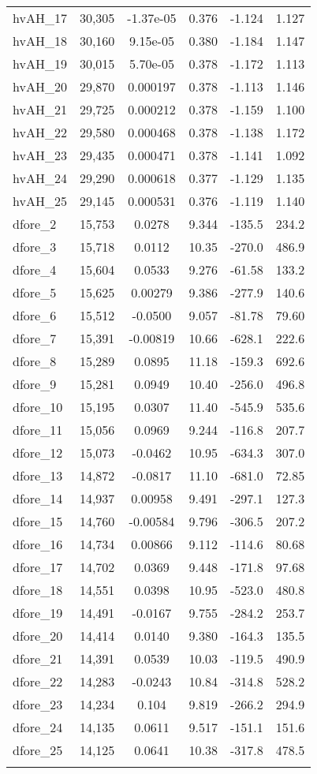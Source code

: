 \begin{tabular}{lccccc}
hvAH\_17 & 30,305 & -1.37e-05 & 0.376 & -1.124 & 1.127 \\
hvAH\_18 & 30,160 & 9.15e-05 & 0.380 & -1.184 & 1.147 \\
hvAH\_19 & 30,015 & 5.70e-05 & 0.378 & -1.172 & 1.113 \\
hvAH\_20 & 29,870 & 0.000197 & 0.378 & -1.113 & 1.146 \\
hvAH\_21 & 29,725 & 0.000212 & 0.378 & -1.159 & 1.100 \\
hvAH\_22 & 29,580 & 0.000468 & 0.378 & -1.138 & 1.172 \\
hvAH\_23 & 29,435 & 0.000471 & 0.378 & -1.141 & 1.092 \\
hvAH\_24 & 29,290 & 0.000618 & 0.377 & -1.129 & 1.135 \\
hvAH\_25 & 29,145 & 0.000531 & 0.376 & -1.119 & 1.140 \\
dfore\_2 & 15,753 & 0.0278 & 9.344 & -135.5 & 234.2 \\
dfore\_3 & 15,718 & 0.0112 & 10.35 & -270.0 & 486.9 \\
dfore\_4 & 15,604 & 0.0533 & 9.276 & -61.58 & 133.2 \\
dfore\_5 & 15,625 & 0.00279 & 9.386 & -277.9 & 140.6 \\
dfore\_6 & 15,512 & -0.0500 & 9.057 & -81.78 & 79.60 \\
dfore\_7 & 15,391 & -0.00819 & 10.66 & -628.1 & 222.6 \\
dfore\_8 & 15,289 & 0.0895 & 11.18 & -159.3 & 692.6 \\
dfore\_9 & 15,281 & 0.0949 & 10.40 & -256.0 & 496.8 \\
dfore\_10 & 15,195 & 0.0307 & 11.40 & -545.9 & 535.6 \\
dfore\_11 & 15,056 & 0.0969 & 9.244 & -116.8 & 207.7 \\
dfore\_12 & 15,073 & -0.0462 & 10.95 & -634.3 & 307.0 \\
dfore\_13 & 14,872 & -0.0817 & 11.10 & -681.0 & 72.85 \\
dfore\_14 & 14,937 & 0.00958 & 9.491 & -297.1 & 127.3 \\
dfore\_15 & 14,760 & -0.00584 & 9.796 & -306.5 & 207.2 \\
dfore\_16 & 14,734 & 0.00866 & 9.112 & -114.6 & 80.68 \\
dfore\_17 & 14,702 & 0.0369 & 9.448 & -171.8 & 97.68 \\
dfore\_18 & 14,551 & 0.0398 & 10.95 & -523.0 & 480.8 \\
dfore\_19 & 14,491 & -0.0167 & 9.755 & -284.2 & 253.7 \\
dfore\_20 & 14,414 & 0.0140 & 9.380 & -164.3 & 135.5 \\
dfore\_21 & 14,391 & 0.0539 & 10.03 & -119.5 & 490.9 \\
dfore\_22 & 14,283 & -0.0243 & 10.84 & -314.8 & 528.2 \\
dfore\_23 & 14,234 & 0.104 & 9.819 & -266.2 & 294.9 \\
dfore\_24 & 14,135 & 0.0611 & 9.517 & -151.1 & 151.6 \\
dfore\_25 & 14,125 & 0.0641 & 10.38 & -317.8 & 478.5 \\
 &  &  &  &  &  \\ \hline
\end{tabular}
